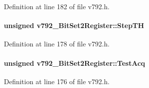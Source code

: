 Definition at line 182 of file v792.h.
\paragraph[{StepTH}]{\setlength{\rightskip}{0pt plus 5cm}unsigned {\bf v792\_\-BitSet2Register::StepTH}}\hfill\label{unionv792__BitSet2Register_a7b9d4ccb188884c635505530af85f0ee}


Definition at line 178 of file v792.h.
\paragraph[{TestAcq}]{\setlength{\rightskip}{0pt plus 5cm}unsigned {\bf v792\_\-BitSet2Register::TestAcq}}\hfill\label{unionv792__BitSet2Register_a537c9d129a291062788c812a9c82a6e6}


Definition at line 176 of file v792.h.